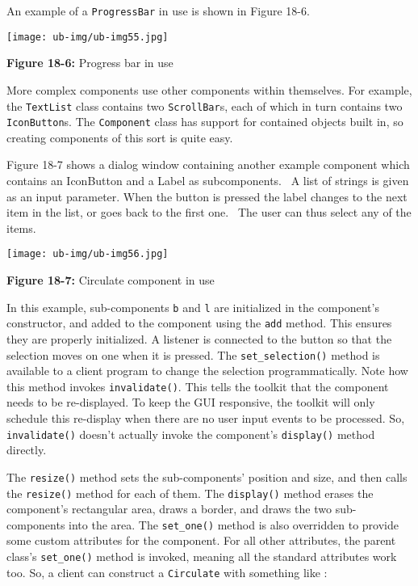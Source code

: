 An example of a \texttt{ProgressBar} in use is shown in Figure 18-6.

\begin{center}
\texttt{[image: ub-img/ub-img55.jpg]}
\end{center}

{\sffamily\bfseries Figure 18-6:}
{\sffamily Progress bar in use}

More complex components use other components within themselves. For
example, the \texttt{TextList} class contains two \texttt{ScrollBar}s,
each of which in turn contains two \texttt{IconButton}s. The
\texttt{Component} class has support for contained objects built in, so
creating components of this sort is quite easy.

Figure 18-7 shows a dialog window containing another example component
which contains an IconButton and a Label as subcomponents. \ A list of
strings is given as an input parameter. When the button is pressed the
label changes to the next item in the list, or goes back to the first
one. \ The user can thus select any of the items.

\begin{center}
\texttt{[image: ub-img/ub-img56.jpg]}
\end{center}

{\sffamily\bfseries Figure 18-7:}
{\sffamily Circulate component in use}

\bigskip

In this example, sub-components \texttt{b} and \texttt{l} are
initialized in the component's constructor, and
added to the component using the \texttt{add} method. This ensures
they are properly initialized. A listener is connected to the button
so that the selection moves on one when it is pressed. The
\texttt{set\_selection()} method is available to a client program to
change the selection programmatically. Note how this method invokes
\texttt{invalidate()}. This tells the toolkit that the component
needs to be re-displayed. To keep the GUI responsive, the toolkit
will only schedule this re-display when there are no user input events
to be processed. So, \texttt{invalidate()} doesn't
actually invoke the component's \texttt{display()}
method directly.

The \texttt{resize()} method sets the sub-components'
position and size, and then calls the \texttt{resize()} method for each
of them. The \texttt{display()} method erases the
component's rectangular area, draws a border, and
draws the two sub-components into the area. The \texttt{set\_one()}
method is also overridden to provide some custom attributes for the
component. For all other attributes, the parent
class's \texttt{set\_one()} method is invoked, meaning
all the standard attributes work too. So, a client can construct a
\texttt{Circulate} with something like :

